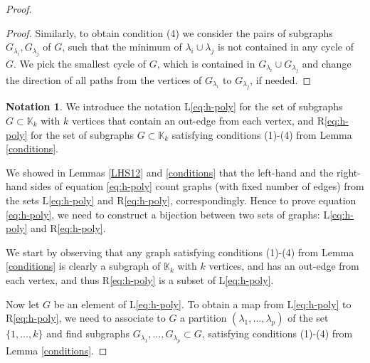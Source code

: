 \documentclass[11pt]{article}
\theoremstyle{definition}
\newtheorem{nota}[theo]{Notation}
\numberwithin{equation}{section}
\begin{document}
\begin{proof}
\begin{proof}
Similarly, to obtain condition (4) we consider the pairs of subgraphs $G_{\lambda_i}, G_{\lambda_j}$ of $G$, such that the minimum of $\lambda_i\cup \lambda_j$ is not contained in any cycle of $G$. We pick the smallest cycle of $G$, which is contained in  $G_{\lambda_i}\cup G_{\lambda_j}$ and change the 
 direction of all paths from the vertices of $G_{\lambda_i}$ to $G_{\lambda_j}$, if needed. 
\end{proof}

\begin{nota}
We introduce the notation L\eqref{eq:h-poly} for the set of subgraphs $G\subset\mathbb{K}_k$ with $k$ vertices that contain an out-edge from each vertex, and R\eqref{eq:h-poly} for the set of subgraphs $G\subset\mathbb{K}_k$ satisfying conditions (1)-(4) from Lemma \ref{conditions}.
\end{nota}

We showed in Lemmas \ref{LHS12} and \ref{conditions} that the left-hand and the right-hand sides of equation \eqref{eq:h-poly} count graphs (with fixed number of edges) from the sets L\eqref{eq:h-poly} and R\eqref{eq:h-poly}, correspondingly.
 Hence to prove equation \eqref{eq:h-poly}, we need to construct a bijection 
 between two sets of graphs: L\eqref{eq:h-poly} and R\eqref{eq:h-poly}. 


We start by observing that any graph satisfying conditions (1)-(4) from Lemma \ref{conditions} is clearly a subgraph of $\mathbb{K}_k$ with $k$ vertices, and has an out-edge from each vertex, and thus R\eqref{eq:h-poly} is a subset of L\eqref{eq:h-poly}.

Now let $G$ be an element of L\eqref{eq:h-poly}. To obtain a map from L\eqref{eq:h-poly} to R\eqref{eq:h-poly}, we 
need to associate to $G$ a partition $(\lambda_1, \ldots ,\lambda_p)$  of the set $\{1, \ldots ,k\}$ and find subgraphs $G_{\lambda_1}, \ldots ,G_{\lambda_p} \subset G$, satisfying conditions (1)-(4) from Lemma \ref{conditions}.


\end{proof}
\end{document}
